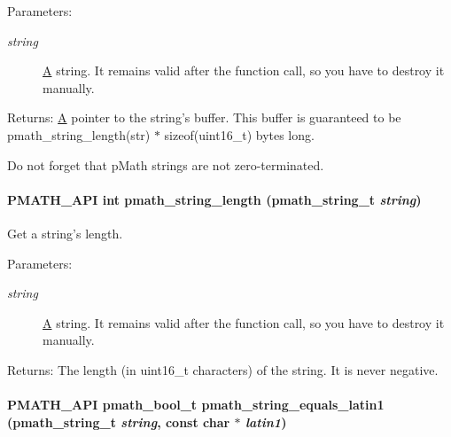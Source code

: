 \begin{Desc}
\item[Parameters:]
\begin{description}
\item[{\em string}]\hyperlink{class_a}{A} string. It remains valid after the function call, so you have to destroy it manually. \end{description}
\end{Desc}
\begin{Desc}
\item[Returns:]\hyperlink{class_a}{A} pointer to the string's buffer. This buffer is guaranteed to be pmath\_\-string\_\-length(str) $\ast$ sizeof(uint16\_\-t) bytes long.\end{Desc}
Do not forget that pMath strings are not zero-terminated. \hypertarget{group__strings_g4f5ac7eaecd0c7e9916794145938874d}{
\paragraph[{pmath\_\-string\_\-length}]{\setlength{\rightskip}{0pt plus 5cm}PMATH\_\-API int pmath\_\-string\_\-length ({\bf pmath\_\-string\_\-t} {\em string})}\hfill}
\label{group__strings_g4f5ac7eaecd0c7e9916794145938874d}


Get a string's length. 

\begin{Desc}
\item[Parameters:]
\begin{description}
\item[{\em string}]\hyperlink{class_a}{A} string. It remains valid after the function call, so you have to destroy it manually. \end{description}
\end{Desc}
\begin{Desc}
\item[Returns:]The length (in uint16\_\-t characters) of the string. It is never negative. \end{Desc}
\hypertarget{group__strings_g710d7a70319d6fa805ddd7ed0ea65365}{
\paragraph[{pmath\_\-string\_\-equals\_\-latin1}]{\setlength{\rightskip}{0pt plus 5cm}PMATH\_\-API {\bf pmath\_\-bool\_\-t} pmath\_\-string\_\-equals\_\-latin1 ({\bf pmath\_\-string\_\-t} {\em string}, \/  const char $\ast$ {\em latin1})}\hfill}
\label{group__strings_g710d7a70319d6fa805ddd7ed0ea65365}


